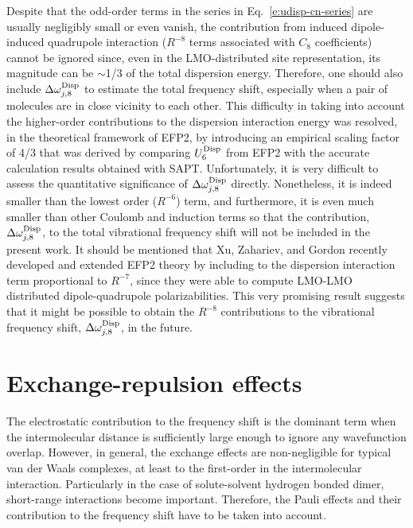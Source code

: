 \documentclass[a4paper,titlepage,twoside,fleqn,12pt]{book}
\begin{document}
\begin{refsection}
Despite that the odd\hyp{}order terms in the series in Eq.~\eqref{e:udisp-cn-series} 
are usually negligibly small or even vanish, the contribution 
from induced dipole\hyp{}induced quadrupole interaction 
($R^{-8}$ terms associated with $C_8$ coefficients) 
cannot be ignored since, even in the LMO\hyp{}distributed 
site representation, its magnitude can be $\sim$1/3 of the total 
dispersion energy.\citep{Adamovic.Gordon.MolPhys.2005} Therefore, one should also include 
$\Delta\omega_{j,8}^{\rm Disp}$ to estimate the total 
frequency shift, especially when a pair of molecules 
are in close vicinity to each other. This difficulty 
in taking into account the higher\hyp{}order contributions 
to the dispersion interaction energy was resolved, in the 
theoretical framework of EFP2, by introducing an empirical 
scaling factor of 4/3 that was derived by comparing 
$U^{\rm Disp}_6$ from EFP2 with the accurate calculation results 
obtained with SAPT.\citep{Jeziorski.Moszynski.Szalewicz.ChemRev.1994,
Adamovic.Gordon.MolPhys.2005} Unfortunately, it is very 
difficult to assess the quantitative significance of 
$\Delta\omega_{j,8}^{\rm Disp}$ directly. Nonetheless, 
it is indeed smaller than the lowest order ($R^{-6}$) term, 
and furthermore, it is even much smaller than other 
Coulomb and induction terms so that the contribution, 
$\Delta\omega_{j,8}^{\rm Disp}$, to the total vibrational 
frequency shift will not be included in the present work. 
It should be mentioned that Xu, Zahariev, and Gordon 
recently developed and extended EFP2 theory by including 
to the dispersion interaction term proportional to $R^{-7}$, 
since they were able to compute LMO\hyp{}LMO distributed 
dipole\hyp{}quadrupole polarizabilities.\citep{Xu.Zahariev.Gordon.JCTC.2014} 
This very promising result suggests that it might be 
possible to obtain the $R^{-8}$ contributions to the 
vibrational frequency shift, $\Delta\omega_{j,8}^{\rm Disp}$, 
in the future.


\section{Exchange-repulsion effects}

The electrostatic contribution to the frequency shift is the dominant term 
when the intermolecular distance is sufficiently large enough to ignore 
any wavefunction overlap. However, in general, the exchange effects
are non\hyp{}negligible for typical van der Waals complexes, at least to the first\hyp{}order
in the intermolecular interaction. Particularly 
in the case of solute\hyp{}solvent hydrogen bonded dimer, 
short\hyp{}range interactions become important. 
Therefore, the Pauli effects and their contribution to the frequency shift have to be taken into account.


\end{refsection}
\end{document}
